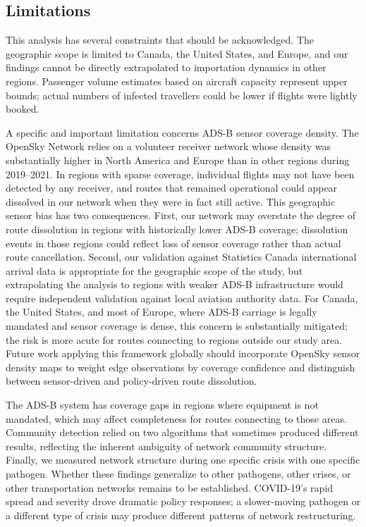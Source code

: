 \documentclass{elsarticle}
\begin{document}
\subsection{Limitations}

This analysis has several constraints that should be acknowledged. The geographic scope is limited to Canada, the United States, and Europe, and our findings cannot be directly extrapolated to importation dynamics in other regions. Passenger volume estimates based on aircraft capacity represent upper bounds; actual numbers of infected travellers could be lower if flights were lightly booked.

A specific and important limitation concerns ADS-B sensor coverage density. The OpenSky Network relies on a volunteer receiver network whose density was substantially higher in North America and Europe than in other regions during 2019--2021. In regions with sparse coverage, individual flights may not have been detected by any receiver, and routes that remained operational could appear dissolved in our network when they were in fact still active. This geographic sensor bias has two consequences. First, our network may overstate the degree of route dissolution in regions with historically lower ADS-B coverage; dissolution events in those regions could reflect loss of sensor coverage rather than actual route cancellation. Second, our validation against Statistics Canada international arrival data is appropriate for the geographic scope of the study, but extrapolating the analysis to regions with weaker ADS-B infrastructure would require independent validation against local aviation authority data. For Canada, the United States, and most of Europe, where ADS-B carriage is legally mandated and sensor coverage is dense, this concern is substantially mitigated; the risk is more acute for routes connecting to regions outside our study area. Future work applying this framework globally should incorporate OpenSky sensor density maps to weight edge observations by coverage confidence and distinguish between sensor-driven and policy-driven route dissolution.

The ADS-B system has coverage gaps in regions where equipment is not mandated, which may affect completeness for routes connecting to those areas. Community detection relied on two algorithms that sometimes produced different results, reflecting the inherent ambiguity of network community structure. Finally, we measured network structure during one specific crisis with one specific pathogen. Whether these findings generalize to other pathogens, other crises, or other transportation networks remains to be established. COVID-19's rapid spread and severity drove dramatic policy responses; a slower-moving pathogen or a different type of crisis may produce different patterns of network restructuring.

\renewcommand\bibname{References}
 {}


\end{document}
